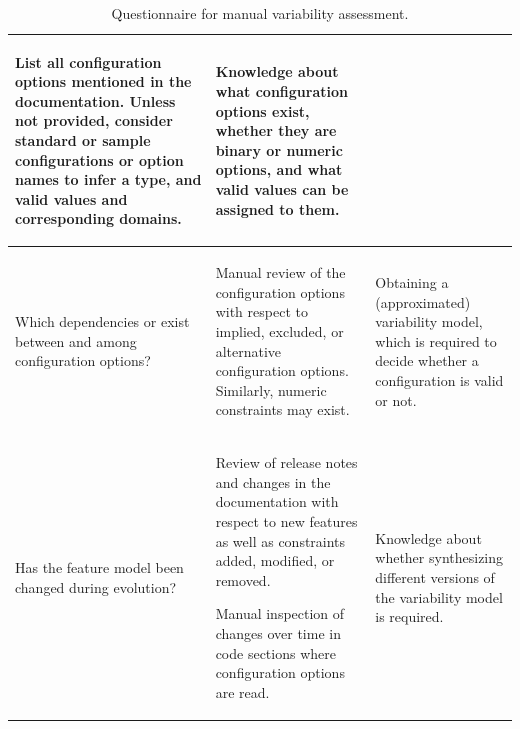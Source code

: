 \begin{table}
\begin{tabular}{L{0.22\textwidth} L{0.48\textwidth} L{0.3\textwidth}}
	{\smaller\begin{compactitem}
	  \item List all configuration options mentioned in the documentation. Unless
	  not provided, consider standard or sample configurations or option names to
	  infer a type, and valid values and corresponding domains.
	\end{compactitem}} &
	
	{Knowledge about what configuration options exist, whether they are binary or
	numeric options, and what valid values can be assigned to them.}\\
	
	\midrule
	
	{Which dependencies or exist between and among configuration options?} & 
	
	{\smaller\begin{compactitem}
	  \item Manual review of the configuration options with respect to implied,
	  excluded, or alternative configuration options. Similarly, numeric
	  constraints may exist. 
	\end{compactitem}} &
	
	{Obtaining a (approximated) variability model, which is required to decide
	whether a configuration is valid or not.}\\
	
	\midrule
	
	{Has the feature model been changed during evolution?} & 
	
	{\smaller\begin{compactitem} 
		\item Review of release notes and changes in the documentation with respect to
		new features as well as constraints added, modified, or removed. 
		\item Manual inspection of changes over time in code sections where
		configuration options are read. 
	\end{compactitem}} & 
	
	{Knowledge about whether synthesizing different versions of the variability
	model is required.}\\
    \bottomrule
  \end{tabular}
  \caption{Questionnaire for manual variability
  assessment.}\label{tab:manual_var_assessment}
\end{table}


